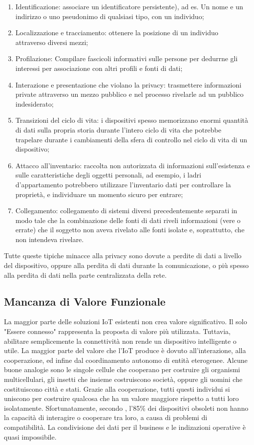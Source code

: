 \documentclass[a4paper,12pt]{article}
\begin{document}
\begin{enumerate}

	\item
	      Identificazione: associare un identificatore  persistente), ad es. Un nome e un indirizzo o uno pseudonimo di qualsiasi tipo, con un individuo;
	\item
	      Localizzazione e tracciamento: ottenere la posizione di un individuo attraverso diversi mezzi;
	\item
	      Profilazione: Compilare fascicoli informativi sulle persone per dedurrne gli interessi per
	      associazione con altri profili e fonti di dati;
	\item
	      Interazione e presentazione che violano la privacy: trasmettere informazioni private attraverso un mezzo pubblico e nel processo rivelarle ad un pubblico indesiderato;
	\item
	      Transizioni del ciclo di vita: i dispositivi spesso memorizzano enormi quantità di dati sulla propria storia durante l'intero ciclo di vita che potrebbe trapelare durante i cambiamenti della sfera di controllo nel ciclo di vita di un dispositivo;
	\item
	      Attacco all'inventario: raccolta non autorizzata di informazioni sull'esistenza e sulle caratteristiche degli oggetti personali, ad esempio, i ladri d'appartamento potrebbero utilizzare l'inventario dati per controllare la proprietà, e individuare un momento sicuro per entrare;
	\item
	      Collegamento: collegamento di sistemi diversi precedentemente separati in modo tale che la combinazione delle fonti di dati riveli informazioni (vere o errate) che il soggetto non aveva rivelato alle fonti isolate e, soprattutto, che non intendeva rivelare.
\end{enumerate}
Tutte queste tipiche minacce alla privacy sono dovute a perdite di dati a livello del dispositivo, oppure alla perdita di dati durante la comunicazione, o più spesso alla perdita di dati nella parte centralizzata della rete.

\subsection{Mancanza di Valore Funzionale}
La maggior parte delle soluzioni IoT esistenti non crea valore significativo. Il solo "Essere connesso" rappresenta la proposta di valore più utilizzata. Tuttavia, abilitare semplicemente la connettività non rende un dispositivo intelligente o utile. La maggior parte del valore che l'IoT produce è dovuto all'interazione, alla cooperazione, ed infine dal coordinamento autonomo di entità eterogenee. Alcune buone analogie sono le singole cellule che cooperano per costruire gli organismi multicellulari, gli insetti che insieme costruiscono società, oppure gli uomini che costituiscono città e stati. Grazie alla cooperazione, tutti questi individui si uniscono per costruire qualcosa che ha un valore maggiore rispetto a tutti loro isolatamente. Sfortunatamente, secondo \cite{29}, l'85\% dei dispositivi obsoleti non hanno la capacità di interagire o cooperare tra loro, a causa di problemi di compatibilità. La condivisione dei dati per il business e le indizazioni operative è quasi impossibile.
\end{document}
